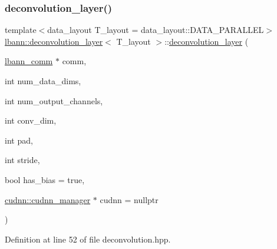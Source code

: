 \subsubsection{\texorpdfstring{deconvolution\+\_\+layer()}{deconvolution\_layer()}\hspace{0.1cm}{\footnotesize\ttfamily [1/2]}}
{\footnotesize\ttfamily template$<$data\+\_\+layout T\+\_\+layout = data\+\_\+layout\+::\+D\+A\+T\+A\+\_\+\+P\+A\+R\+A\+L\+L\+EL$>$ \\
\hyperlink{classlbann_1_1deconvolution__layer}{lbann\+::deconvolution\+\_\+layer}$<$ T\+\_\+layout $>$\+::\hyperlink{classlbann_1_1deconvolution__layer}{deconvolution\+\_\+layer} (\begin{DoxyParamCaption}\item[{\hyperlink{classlbann_1_1lbann__comm}{lbann\+\_\+comm} $\ast$}]{comm,  }\item[{int}]{num\+\_\+data\+\_\+dims,  }\item[{int}]{num\+\_\+output\+\_\+channels,  }\item[{int}]{conv\+\_\+dim,  }\item[{int}]{pad,  }\item[{int}]{stride,  }\item[{bool}]{has\+\_\+bias = {\ttfamily true},  }\item[{\hyperlink{classlbann_1_1cudnn_1_1cudnn__manager}{cudnn\+::cudnn\+\_\+manager} $\ast$}]{cudnn = {\ttfamily nullptr} }\end{DoxyParamCaption})\hspace{0.3cm}{\ttfamily [inline]}}



Definition at line 52 of file deconvolution.\+hpp.


